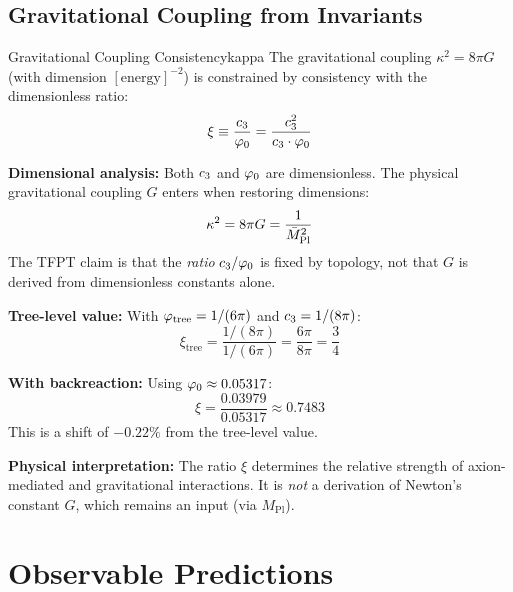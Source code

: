 \subsection{Gravitational Coupling from Invariants}

\begin{corollary}{Gravitational Coupling Consistency}{kappa}
The gravitational coupling $\kappa^2 = 8\pi G$ (with dimension $[\text{energy}]^{-2}$) 
is constrained by consistency with the dimensionless ratio:
\begin{equation}
    \xi \equiv \frac{c_3}{\varphi_0} = \frac{c_3^2}{c_3 \cdot \varphi_0}
\end{equation}

\textbf{Dimensional analysis:} Both $c_3$ and $\varphi_0$ are dimensionless. The 
physical gravitational coupling $G$ enters when restoring dimensions:
\begin{equation}
    \kappa^2 = 8\pi G = \frac{1}{\bar{M}_{\mathrm{Pl}}^2}
\end{equation}
The TFPT claim is that the \emph{ratio} $c_3/\varphi_0$ is fixed by topology, 
not that $G$ is derived from dimensionless constants alone.

\textbf{Tree-level value:} With $\varphi_{\mathrm{tree}} = 1/(6\pi)$ and $c_3 = 1/(8\pi)$:
\begin{equation}
    \xi_{\text{tree}} = \frac{1/(8\pi)}{1/(6\pi)} = \frac{6\pi}{8\pi} = \frac{3}{4}
\end{equation}

\textbf{With backreaction:} Using $\varphi_0 \approx 0.05317$:
\begin{equation}
    \xi = \frac{0.03979}{0.05317} \approx 0.7483
\end{equation}
This is a shift of $-0.22\%$ from the tree-level value.

\textbf{Physical interpretation:} The ratio $\xi$ determines the relative strength 
of axion-mediated and gravitational interactions. It is \emph{not} a derivation of 
Newton's constant $G$, which remains an input (via $M_{\text{Pl}}$).
\end{corollary}

\section{Observable Predictions}

